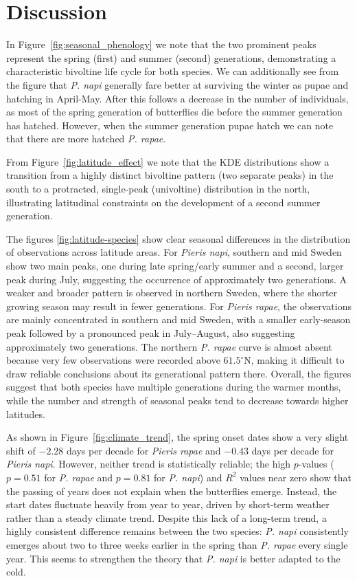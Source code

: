 \documentclass{article}
\begin{document}
\FloatBarrier

\section{Discussion}

In Figure~\ref{fig:seasonal_phenology} we note that the two prominent peaks represent the spring (first) and summer (second) generations, demonstrating a characteristic bivoltine life cycle for both species. We can additionally see from the figure that \textit{P. napi} generally fare better at surviving the winter as pupae and hatching in April-May. After this follows a decrease in the number of individuals, as most of the spring generation of butterflies die before the summer generation has hatched. However, when the summer generation pupae hatch we can note that there are more hatched \textit{P. rapae}. 

From Figure~\ref{fig:latitude_effect} we note that the KDE distributions show a transition from a highly distinct bivoltine pattern (two separate peaks) in the south to a protracted, single-peak (univoltine) distribution in the north, illustrating latitudinal constraints on the development of a second summer generation.

The figures \ref{fig:latitude-species} show clear seasonal differences in the distribution of observations across latitude areas. For \textit{Pieris napi}, southern and mid Sweden show two main peaks, one during late spring/early summer and a second, larger peak during July, suggesting the occurrence of approximately two generations. A weaker and broader pattern is observed in northern Sweden, where the shorter growing season may result in fewer generations. For \textit{Pieris rapae}, the observations are mainly concentrated in southern and mid Sweden, with a smaller early-season peak followed by a pronounced peak in July--August, also suggesting approximately two generations. The northern \textit{P. rapae} curve is almost absent because very few observations were recorded above $61.5^\circ$N, making it difficult to draw reliable conclusions about its generational pattern there. Overall, the figures suggest that both species have multiple generations during the warmer months, while the number and strength of seasonal peaks tend to decrease towards higher latitudes.

As shown in Figure~\ref{fig:climate_trend}, the spring onset dates show a very slight shift of $-2.28$ days per decade for \textit{Pieris rapae} and $-0.43$ days per decade for \textit{Pieris napi}. However, neither trend is statistically reliable; the high $p$-values ($p = 0.51$ for \textit{P. rapae} and $p = 0.81$ for \textit{P. napi}) and $R^2$ values near zero show that the passing of years does not explain when the butterflies emerge. Instead, the start dates fluctuate heavily from year to year, driven by short-term weather rather than a steady climate trend. Despite this lack of a long-term trend, a highly consistent difference remains between the two species: \textit{P. napi} consistently emerges about two to three weeks earlier in the spring than \textit{P. rapae} every single year. This seems to strengthen the theory that \textit{P. napi} is better adapted to the cold. 
\end{document}

